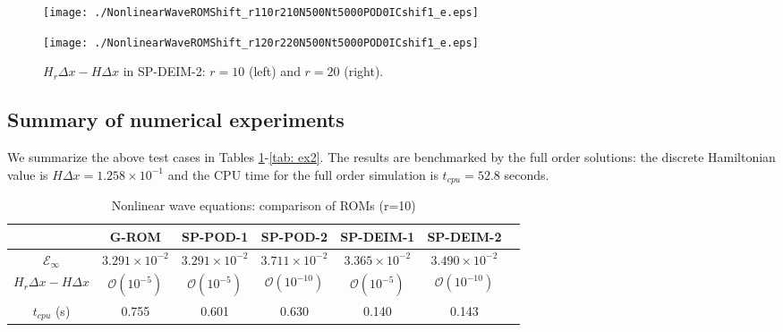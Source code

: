 \documentclass[11pt]{article}
\begin{document}
\begin{figure}[htb]
\centering
\begin{minipage}[ht]{0.45\linewidth}
\texttt{[image: ./NonlinearWaveROMShift\_r110r210N500Nt5000POD0ICshif1\_e.eps]}
\end{minipage}
\hspace{1cm}
\begin{minipage}[ht]{0.45\linewidth}
\texttt{[image: ./NonlinearWaveROMShift\_r120r220N500Nt5000POD0ICshif1\_e.eps]}
\end{minipage}
\caption{
$H_r\Delta x-H\Delta x$ in SP-DEIM-2: $r=10$ (left) and $r=20$ (right). 
}\label{Fig: sp-deim2}
\end{figure}

\subsection{Summary of numerical experiments}

We summarize the above test cases in Tables \ref{tab: ex1}-\ref{tab: ex2}. The results are benchmarked by the full order solutions:  
the discrete Hamiltonian value is $H\Delta x = 1.258\times 10^{-1}$ and the CPU time for the full order simulation is $t_{cpu}= 52.8$ seconds.
\begin{table}[htp]
\begin{center}
\caption{Nonlinear wave equations: comparison of ROMs (r=10)}
\label{tab: ex1}
\begin{tabular}{| c | c | c | c | c | c | c |} \hline
  {}                    &   G-ROM                 & SP-POD-1               & SP-POD-2                & SP-DEIM-1             & SP-DEIM-2 \\ \hline
  $\mathcal{E}_\infty$  &  $3.291\times 10^{-2}$  & $3.291\times 10^{-2}$  & $3.711\times 10^{-2}$   & $3.365\times 10^{-2}$ & $3.490\times 10^{-2}$   \\
  $H_r\Delta x-H\Delta x$    			& $\mathcal{O}(10^{-5})$  & $\mathcal{O}(10^{-5})$ & $\mathcal{O}(10^{-10})$ & $\mathcal{O}(10^{-5})$& $\mathcal{O}(10^{-10})$ \\     
  $t_{cpu}$ (s)    		& 0.755                   & 0.601                  & 0.630                   & 0.140                 & 0.143 \\ 
  \hline
  
\end{tabular}
\end{center}
\end{table}
\end{document}
